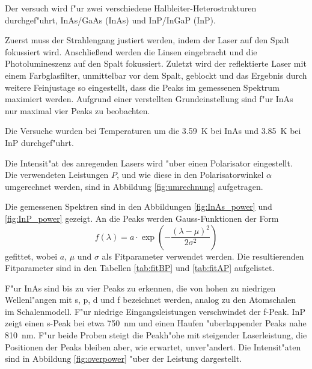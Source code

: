Der versuch wird f"ur zwei verschiedene Halbleiter-Heterostrukturen durchgef"uhrt, InAs/GaAs (InAs) und InP/InGaP (InP).

Zuerst muss der Strahlengang justiert werden, indem der Laser auf den Spalt fokussiert wird.
Anschlie\ss end werden die Linsen eingebracht und die Photolumineszenz auf den Spalt fokussiert.
Zuletzt wird der reflektierte Laser mit einem Farbglasfilter, unmittelbar vor dem Spalt, geblockt und das Ergebnis durch weitere Feinjustage so eingestellt, dass die Peaks im gemessenen Spektrum maximiert werden.
Aufgrund einer verstellten Grundeinstellung sind f"ur InAs nur maximal vier Peaks zu beobachten.

Die Versuche wurden bei Temperaturen um die \SI{3.59}{\kelvin} bei InAs und \SI{3.85}{\kelvin} bei InP durchgef"uhrt.

Die Intensit"at des anregenden Lasers wird "uber einen Polarisator eingestellt.
Die verwendeten Leistungen $P$, und wie diese in den Polarisatorwinkel $\alpha$ umgerechnet werden, sind in Abbildung \vref{fig:umrechnung} aufgetragen.

Die gemessenen Spektren sind in den Abbildungen \vref{fig:InAs_power} und \vref{fig:InP_power} gezeigt.
An die Peaks werden Gauss-Funktionen der Form
\begin{equation}
f(\lambda)
    = a\cdot\exp(-\frac{(\lambda-\mu)^2}{2\sigma^2})
    \label{eq:fit}
\end{equation}
gefittet, wobei $a$, $\mu$ und $\sigma$ als Fitparameter verwendet werden.
Die resultierenden Fitparameter sind in den Tabellen \vref{tab:fitBP} und \vref{tab:fitAP} aufgelistet.

F"ur InAs sind bis zu vier Peaks zu erkennen, die von hohen zu niedrigen Wellenl"angen mit s, p, d und f bezeichnet werden, analog zu den Atomschalen im Schalenmodell.
F"ur niedrige Eingangsleistungen verschwindet der f-Peak.
InP zeigt einen s-Peak bei etwa \SI{750}{nm} und einen Haufen "uberlappender Peaks nahe \SI{810}{nm}.
F"ur beide Proben steigt die Peakh"ohe mit steigender Laserleistung, die Positionen der Peaks bleiben aber, wie erwartet, unver"andert.
Die Intensit"aten sind in Abbildung \vref{fig:overpower} "uber der Leistung dargestellt.